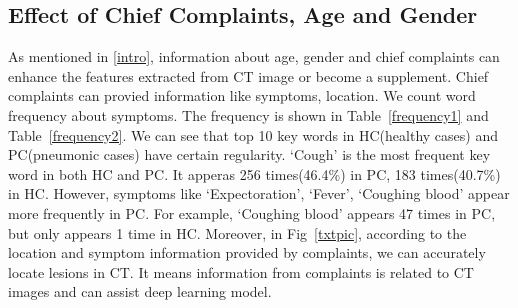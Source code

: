 \documentclass[journal]{IEEEtran}
\begin{document}
\subsection{Effect of Chief Complaints, Age and Gender}
\label{complaintsagegender}
As mentioned in \ref{intro}, information about age, gender and chief complaints can enhance the features extracted from CT image or become a supplement. Chief complaints can provied information like symptoms, location.
We count word frequency about symptoms. The frequency is shown in Table~\ref{frequency1} and Table~\ref{frequency2}. We can see that top 10 key words in HC(healthy cases) and PC(pneumonic cases) have certain regularity. `Cough' is the most frequent key word in both HC and PC. It apperas 256 times(46.4\%) in PC, 183 times(40.7\%) in HC. However, symptoms like `Expectoration', `Fever', `Coughing blood' appear more frequently in PC. For example, `Coughing blood' appears 47 times in PC, but only appears 1 time in HC. 
Moreover, in Fig~\ref{txtpic}, according to the location and symptom information provided by complaints, we can accurately locate lesions in CT. It means information from complaints is related to CT images and can assist deep learning model.
\end{document}
